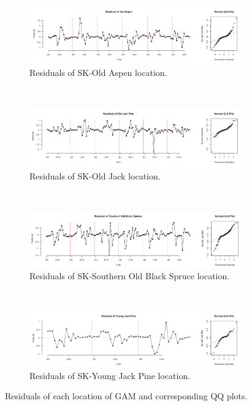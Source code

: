 \documentclass{article}
\begin{document}
\begin{figure}[!ht]
    \centering
    \begin{subfigure}[ht]{0.85\textwidth}
        \includegraphics[width=\textwidth]{resOAP.png}
        \caption{Residuals of SK-Old Aspen location.}
    \end{subfigure}
    ~ 
    \begin{subfigure}[ht]{0.85\textwidth}
        \includegraphics[width=\textwidth]{resOJP.png}
        \caption{Residuals of SK-Old Jack location.}
     \end{subfigure}
        ~ 
      \begin{subfigure}[ht]{0.85\textwidth}
        \includegraphics[width=\textwidth]{resSOU.png}
        \caption{Residuals of SK-Southern Old Black Spruce location.}
     \end{subfigure}
     ~
      \begin{subfigure}[ht]{0.85\textwidth}
        \includegraphics[width=\textwidth]{resYJP.png}
        \caption{Residuals of SK-Young Jack Pine location.}
     \end{subfigure}
    \caption{Residuals of each location of GAM and corresponding QQ plots.}\label{Fig:EachRes}
\end{figure}
\end{document}
